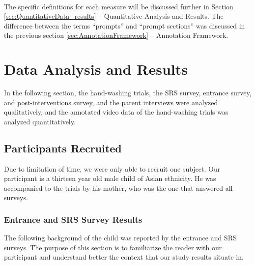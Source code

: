 \documentclass{ut-thesis}
\begin{document}
\paragraph{} %
The specific definitions for each measure will be discussed further in Section \ref{sec:QuantitativeData_results} -- Quantitative Analysis and Results.  The difference between the terms ``prompts'' and ``prompt sections'' was discussed in the previous section \ref{sec:AnnotationFramework} -- Annotation Framework.
\section{Data Analysis and Results}
\label{Sec:DataAnalysisAndResults}
In the following section, the hand-washing trials, the SRS survey, entrance survey, and post-interventions survey, and the parent interviews were analyzed qualitatively, and the annotated video data of the hand-washing trials was analyzed quantitatively.

\subsection{Participants Recruited}
Due to limitation of time, we were only able to recruit one subject.  Our participant is a thirteen year old male child of Asian ethnicity.  He was accompanied to the trials by his mother, who was the one that answered all surveys.

\subsubsection{Entrance and SRS Survey Results}
The following background of the child was reported by the entrance and SRS surveys.  The purpose of this section is to familiarize the reader with our participant and understand better the context that our study results situate in.
\end{document}
